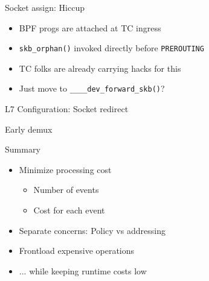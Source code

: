 \documentclass[black,white]{beamer}
\DeclareRobustCommand{\#}{\adjustbox{valign=B,totalheight=.57\baselineskip}{\oldhash}}%
\begin{document}
    \begin{frame}[fragile]{Socket assign: Hiccup}
        \centering
        \begin{itemize}
            \item BPF progs are attached at TC ingress \medskip
            \item \verb+skb_orphan()+ invoked directly before \verb+PREROUTING+ \medskip
            \pause
            \item TC folks are already carrying hacks for this\footnotemark \medskip
            \pause
            \item Just move to \verb+____dev_forward_skb()+\footnotemark? \medskip
        \end{itemize}
    \end{frame}

    \begin{frame}{L7 Configuration: Socket redirect}
        
    \end{frame}

    \begin{frame}[fragile]{Early demux}
        \centering
        
    \end{frame}

    \begin{frame}{Summary}
        \begin{itemize}
            \item Minimize processing cost \smallskip
            \begin{itemize}
                \item Number of events \medskip
                \item Cost for each event \medskip
            \end{itemize}
            \item Separate concerns: Policy vs addressing \medskip
            \item Frontload expensive operations \medskip
            \item ... while keeping runtime costs low \medskip
        \end{itemize}
    \end{frame}
\end{document}
